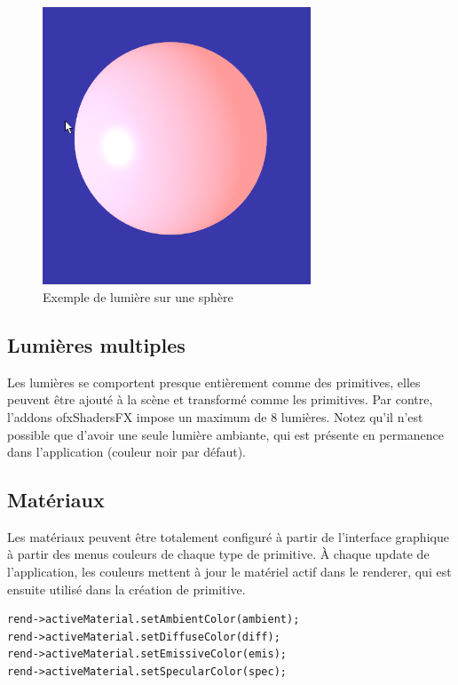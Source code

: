 \begin{figure}[h]
	\centering
	\includegraphics[width=8cm]{fig/lumiere.png}
	\caption{Exemple de lumière sur une sphère}
	\label{fig:lumiere}
\end{figure}


\subsection{Lumières multiples}
Les lumières se comportent presque entièrement comme des primitives, elles peuvent être ajouté à la scène et transformé comme les primitives. Par contre, l'addons ofxShadersFX impose un maximum de 8 lumières. Notez qu'il n'est possible que d'avoir une seule lumière ambiante, qui est présente en permanence dans l'application (couleur noir par défaut).

\subsection{Matériaux}
Les matériaux peuvent être totalement configuré à partir de l'interface graphique à partir des menus couleurs de chaque type de primitive. À chaque update de l'application, les couleurs mettent à jour le matériel actif dans le renderer, qui est ensuite utilisé dans la création de primitive.

\begin{lstlisting}
rend->activeMaterial.setAmbientColor(ambient);
rend->activeMaterial.setDiffuseColor(diff);
rend->activeMaterial.setEmissiveColor(emis);
rend->activeMaterial.setSpecularColor(spec);
\end{lstlisting}


